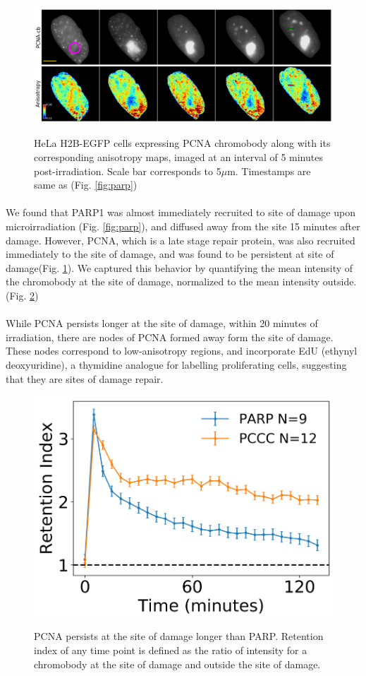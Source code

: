 \begin{figure}[H]
    {\hfill\includegraphics[clip, width=1\linewidth]{figures/pcna.png}\hspace*{\fill}}
    \caption{HeLa H2B-EGFP cells expressing PCNA chromobody along with its corresponding anisotropy maps, imaged at an  interval of 5 minutes post-irradiation. Scale bar corresponds to 5$\mu$m. Timestamps are same as (Fig. \ref{fig:parp})}
    {\label{fig:pcna}}
\end{figure}


\paragraph*{} We found that PARP1 was almost immediately recruited to site of damage upon microirradiation (Fig. \ref{fig:parp}), and diffused away from the site 15 minutes after damage. However, PCNA, which is a late stage repair protein, was also recruited immediately to the site of damage, and was found to be persistent at site of damage(Fig. \ref{fig:pcna}). We captured this behavior by quantifying the mean intensity of the chromobody at the site of damage, normalized to the mean intensity outside. (Fig. \ref{fig:retention})

\paragraph*{} While PCNA persists longer at the site of damage, within 20 minutes of irradiation, there are nodes of PCNA formed away form the site of damage. These nodes correspond to low-anisotropy regions, and incorporate EdU (ethynyl deoxyuridine), a thymidine analogue for labelling proliferating cells, suggesting that they are sites of damage repair.

\begin{figure}[H]
    {\hfill\includegraphics[clip, width=0.5\linewidth]{figures/retention.png}\hspace*{\fill}}
    \caption{PCNA persists at the site of damage longer than PARP. Retention index of any time point is defined as the ratio of intensity for a chromobody at the site of damage and outside the site of damage.}
    {\label{fig:retention}}
\end{figure}

